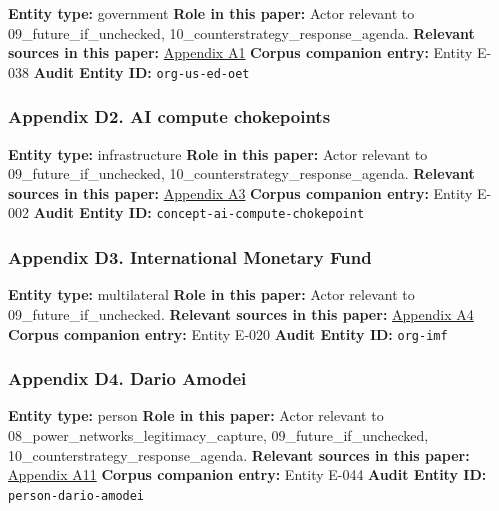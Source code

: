 \documentclass[
  american,
  11pt,
  letterpaper,
]{article}
\begin{document}
\textbf{Entity type:} government \textbf{Role in this paper:} Actor
relevant to 09\_future\_if\_unchecked,
10\_counterstrategy\_response\_agenda. \textbf{Relevant sources in this
paper:}
\hyperref[ch-09-appendix-a1-artificial-intelligence-and-the-future-of-teaching-and-learning-insights-and-recommendations]{Appendix
A1} \textbf{Corpus companion entry:} Entity E-038 \textbf{Audit Entity
ID:} \texttt{org-us-ed-oet}

\subsubsection{Appendix D2. AI compute
chokepoints}\label{ch-09-appendix-d2-ai-compute-chokepoints}

\textbf{Entity type:} infrastructure \textbf{Role in this paper:} Actor
relevant to 09\_future\_if\_unchecked,
10\_counterstrategy\_response\_agenda. \textbf{Relevant sources in this
paper:}
\hyperref[ch-09-appendix-a3-computing-power-and-the-governance-of-artificial-intelligence]{Appendix
A3} \textbf{Corpus companion entry:} Entity E-002 \textbf{Audit Entity
ID:} \texttt{concept-ai-compute-chokepoint}

\subsubsection{Appendix D3. International Monetary
Fund}\label{ch-09-appendix-d3-international-monetary-fund}

\textbf{Entity type:} multilateral \textbf{Role in this paper:} Actor
relevant to 09\_future\_if\_unchecked. \textbf{Relevant sources in this
paper:}
\hyperref[ch-09-appendix-a4-gen-ai-artificial-intelligence-and-the-future-of-work]{Appendix
A4} \textbf{Corpus companion entry:} Entity E-020 \textbf{Audit Entity
ID:} \texttt{org-imf}

\subsubsection{Appendix D4. Dario
Amodei}\label{ch-09-appendix-d4-dario-amodei}

\textbf{Entity type:} person \textbf{Role in this paper:} Actor relevant
to 08\_power\_networks\_legitimacy\_capture, 09\_future\_if\_unchecked,
10\_counterstrategy\_response\_agenda. \textbf{Relevant sources in this
paper:}
\hyperref[ch-09-appendix-a11-the-adolescence-of-technology]{Appendix
A11} \textbf{Corpus companion entry:} Entity E-044 \textbf{Audit Entity
ID:} \texttt{person-dario-amodei}
\end{document}
